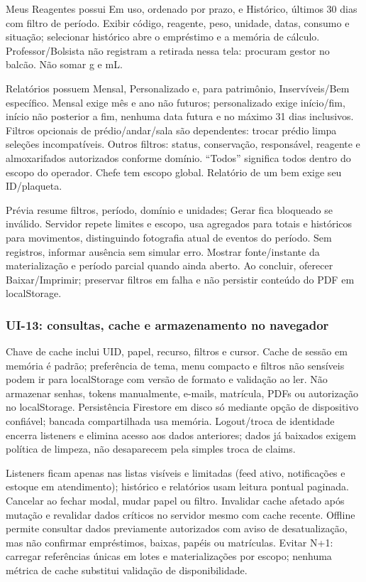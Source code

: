 Meus Reagentes possui Em uso, ordenado por prazo, e Histórico, últimos 30 dias com filtro de período. Exibir código, reagente, peso, unidade, datas, consumo e situação; selecionar histórico abre o empréstimo e a memória de cálculo. Professor/Bolsista não registram a retirada nessa tela: procuram gestor no balcão. Não somar g e mL.

Relatórios possuem Mensal, Personalizado e, para patrimônio, Inservíveis/Bem específico. Mensal exige mês e ano não futuros; personalizado exige início/fim, início não posterior a fim, nenhuma data futura e no máximo 31 dias inclusivos. Filtros opcionais de prédio/andar/sala são dependentes: trocar prédio limpa seleções incompatíveis. Outros filtros: status, conservação, responsável, reagente e almoxarifados autorizados conforme domínio. ``Todos'' significa todos dentro do escopo do operador. Chefe tem escopo global. Relatório de um bem exige seu ID/plaqueta.

Prévia resume filtros, período, domínio e unidades; Gerar fica bloqueado se inválido. Servidor repete limites e escopo, usa agregados para totais e históricos para movimentos, distinguindo fotografia atual de eventos do período. Sem registros, informar ausência sem simular erro. Mostrar fonte/instante da materialização e período parcial quando ainda aberto. Ao concluir, oferecer Baixar/Imprimir; preservar filtros em falha e não persistir conteúdo do PDF em localStorage.

\subsubsection{UI-13: consultas, cache e armazenamento no navegador}
Chave de cache inclui UID, papel, recurso, filtros e cursor. Cache de sessão em memória é padrão; preferência de tema, menu compacto e filtros não sensíveis podem ir para localStorage com versão de formato e validação ao ler. Não armazenar senhas, tokens manualmente, e-mails, matrícula, PDFs ou autorização no localStorage. Persistência Firestore em disco só mediante opção de dispositivo confiável; bancada compartilhada usa memória. Logout/troca de identidade encerra listeners e elimina acesso aos dados anteriores; dados já baixados exigem política de limpeza, não desaparecem pela simples troca de claims.

Listeners ficam apenas nas listas visíveis e limitadas (feed ativo, notificações e estoque em atendimento); histórico e relatórios usam leitura pontual paginada. Cancelar ao fechar modal, mudar papel ou filtro. Invalidar cache afetado após mutação e revalidar dados críticos no servidor mesmo com cache recente. Offline permite consultar dados previamente autorizados com aviso de desatualização, mas não confirmar empréstimos, baixas, papéis ou matrículas. Evitar N+1: carregar referências únicas em lotes e materializações por escopo; nenhuma métrica de cache substitui validação de disponibilidade.

